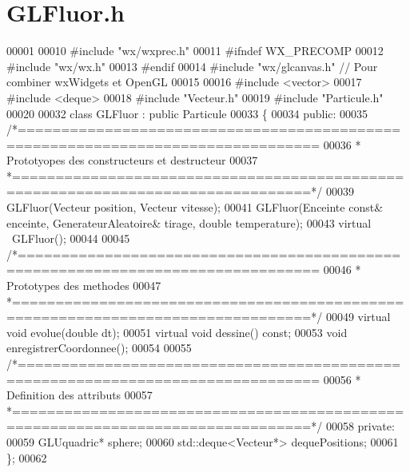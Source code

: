 \section{G\+L\+Fluor.\+h}
\label{_g_l_fluor_8h_source}

\begin{DoxyCode}
00001 
00010 \textcolor{preprocessor}{#include "wx/wxprec.h"}
00011 \textcolor{preprocessor}{#ifndef WX\_PRECOMP}
00012 \textcolor{preprocessor}{#include "wx/wx.h"}
00013 \textcolor{preprocessor}{#endif}
00014 \textcolor{preprocessor}{#include "wx/glcanvas.h"} \textcolor{comment}{// Pour combiner wxWidgets et OpenGL}
00015 
00016 \textcolor{preprocessor}{#include <vector>}
00017 \textcolor{preprocessor}{#include <deque>}
00018 \textcolor{preprocessor}{#include "Vecteur.h"}
00019 \textcolor{preprocessor}{#include "Particule.h"}
00020 
00032 \textcolor{keyword}{class }GLFluor : \textcolor{keyword}{public} Particule
00033 \{
00034     \textcolor{keyword}{public}:
00035 \textcolor{comment}{/*================================================================================}
00036 \textcolor{comment}{ * Prototyopes des constructeurs et destructeur}
00037 \textcolor{comment}{ *================================================================================*/}
00039     GLFluor(Vecteur position, Vecteur vitesse);
00041     GLFluor(Enceinte \textcolor{keyword}{const}& enceinte, GenerateurAleatoire& tirage, \textcolor{keywordtype}{double} temperature);
00043     \textcolor{keyword}{virtual} ~GLFluor();
00044     
00045 \textcolor{comment}{/*================================================================================}
00046 \textcolor{comment}{ * Prototypes des methodes}
00047 \textcolor{comment}{ *================================================================================*/}
00049     \textcolor{keyword}{virtual} \textcolor{keywordtype}{void} evolue(\textcolor{keywordtype}{double} dt);
00051     \textcolor{keyword}{virtual} \textcolor{keywordtype}{void} dessine() \textcolor{keyword}{const};
00053     \textcolor{keywordtype}{void} enregistrerCoordonnee();
00054     
00055 \textcolor{comment}{/*================================================================================}
00056 \textcolor{comment}{ * Definition des attributs}
00057 \textcolor{comment}{ *================================================================================*/}
00058     \textcolor{keyword}{private}:
00059     GLUquadric* sphere;
00060     std::deque<Vecteur*> dequePositions;
00061 \};
00062 
\end{DoxyCode}
